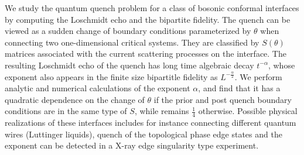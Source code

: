 
We study the quantum quench problem for a class of bosonic conformal interfaces by computing the Loschmidt echo and the bipartite fidelity. The quench can be viewed as a sudden change of boundary conditions parameterized by $\theta$ when connecting two one-dimensional critical systems. They are classified by $S(\theta)$ matrices associated with the current scattering processes on the interface. The resulting Loschmidt echo of the quench has long time algebraic decay $t^{-\alpha}$, whose exponent also appears in the finite size bipartitle fidelity as $L^{-\frac{\alpha}{2}}$. We perform analytic and numerical calculations of the exponent $\alpha$, and find that it has a quadratic dependence on the change of $\theta$ if the prior and post quench boundary conditions are in the same type of $S$, while remains $\frac{1}{4}$ otherwise. Possible physical realizations of these interfaces includes for instance connecting different quantum wires (Luttinger liquids), quench of the topological phase edge states \etc and the exponent can be detected in a X-ray edge singularity type experiment. 


